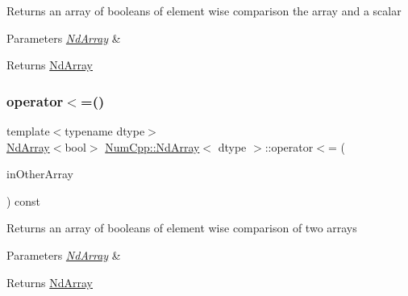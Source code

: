 Returns an array of booleans of element wise comparison the array and a scalar


\begin{DoxyParams}{Parameters}
{\em \mbox{\hyperlink{class_num_cpp_1_1_nd_array}{Nd\+Array}}} & \\
\hline
\end{DoxyParams}
\begin{DoxyReturn}{Returns}
\mbox{\hyperlink{class_num_cpp_1_1_nd_array}{Nd\+Array}} 
\end{DoxyReturn}
\mbox{\label{class_num_cpp_1_1_nd_array_a998f124d73c79190751d812d9c2ae25e}} 
\subsubsection{\texorpdfstring{operator$<$=()}{operator<=()}\hspace{0.1cm}{\footnotesize\ttfamily [2/2]}}
{\footnotesize\ttfamily template$<$typename dtype$>$ \\
\mbox{\hyperlink{class_num_cpp_1_1_nd_array}{Nd\+Array}}$<$bool$>$ \mbox{\hyperlink{class_num_cpp_1_1_nd_array}{Num\+Cpp\+::\+Nd\+Array}}$<$ dtype $>$\+::operator$<$= (\begin{DoxyParamCaption}\item[{const \mbox{\hyperlink{class_num_cpp_1_1_nd_array}{Nd\+Array}}$<$ dtype $>$ \&}]{in\+Other\+Array }\end{DoxyParamCaption}) const\hspace{0.3cm}{\ttfamily [inline]}}

Returns an array of booleans of element wise comparison of two arrays


\begin{DoxyParams}{Parameters}
{\em \mbox{\hyperlink{class_num_cpp_1_1_nd_array}{Nd\+Array}}} & \\
\hline
\end{DoxyParams}
\begin{DoxyReturn}{Returns}
\mbox{\hyperlink{class_num_cpp_1_1_nd_array}{Nd\+Array}} 
\end{DoxyReturn}
\mbox{\label{class_num_cpp_1_1_nd_array_adcf810c54dabbd02f57690dd1df6c266}} 
